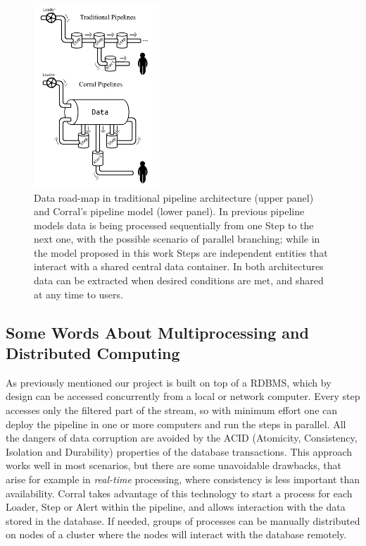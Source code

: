 \documentclass[final,5p,times,twocolumn,authoryear]{elsarticle}
\begin{document}
\begin{figure}
\centering
\includegraphics[width=0.42\textwidth]{corral_diagram.pdf}
\caption{\label{fig:concurrent}
    Data road-map in traditional pipeline architecture (upper panel)
    and Corral's pipeline model (lower panel).
    In previous pipeline models data is being processed sequentially
    from one Step to the next one, with the possible scenario of
    parallel branching; while in the model proposed in this work
    Steps are independent entities that interact with a shared
    central data container.
    In both architectures data can be extracted when desired
    conditions are met, and shared at any time to users.
}
\end{figure}

\subsection{Some Words About Multiprocessing and Distributed Computing}
%
As previously mentioned our project is built on top of a RDBMS, which by design
can be accessed concurrently from a local or network computer.
%
Every step accesses only the filtered part of the stream,
so with minimum effort one can deploy the pipeline in one or more
computers and run the steps in parallel.
%
All the dangers of data corruption are avoided
by the ACID (Atomicity, Consistency, Isolation and Durability)
properties of the database transactions.
%
\textcolor{blue!95}{
This approach works well in most scenarios, but there are some unavoidable 
drawbacks, that arise for example in \textit{real-time} processing, where 
consistency is less important than availability.}
%
Corral takes advantage of this technology to start a process for each Loader,
Step or Alert within the pipeline, and allows interaction with the data stored in the database.
%
If needed, groups of processes can be manually distributed on nodes of a
cluster where the nodes will interact with the database remotely.
\end{document}
